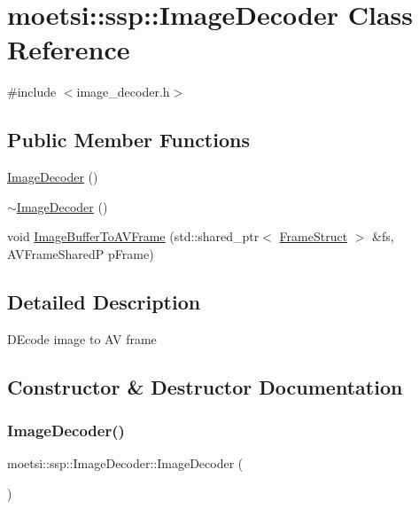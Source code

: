 \hypertarget{classmoetsi_1_1ssp_1_1ImageDecoder}{}\section{moetsi\+:\+:ssp\+:\+:Image\+Decoder Class Reference}
\label{classmoetsi_1_1ssp_1_1ImageDecoder}


{\ttfamily \#include $<$image\+\_\+decoder.\+h$>$}

\subsection*{Public Member Functions}
\begin{DoxyCompactItemize}
\item 
\hyperlink{classmoetsi_1_1ssp_1_1ImageDecoder_a9054b4b5f32b6bcc000392680ea4ca5c}{Image\+Decoder} ()
\item 
\hyperlink{classmoetsi_1_1ssp_1_1ImageDecoder_ad9bdd415935a982e8a36eb9d297e0f7f}{$\sim$\+Image\+Decoder} ()
\item 
void \hyperlink{classmoetsi_1_1ssp_1_1ImageDecoder_a7a4e299977711727385c4c4e127453d2}{Image\+Buffer\+To\+A\+V\+Frame} (std\+::shared\+\_\+ptr$<$ \hyperlink{structmoetsi_1_1ssp_1_1FrameStruct}{Frame\+Struct} $>$ \&fs, A\+V\+Frame\+SharedP p\+Frame)
\end{DoxyCompactItemize}


\subsection{Detailed Description}
D\+Ecode image to AV frame 

\subsection{Constructor \& Destructor Documentation}
\mbox{\label{classmoetsi_1_1ssp_1_1ImageDecoder_a9054b4b5f32b6bcc000392680ea4ca5c}} 
\subsubsection{\texorpdfstring{Image\+Decoder()}{ImageDecoder()}}
{\footnotesize\ttfamily moetsi\+::ssp\+::\+Image\+Decoder\+::\+Image\+Decoder (\begin{DoxyParamCaption}{ }\end{DoxyParamCaption})}

